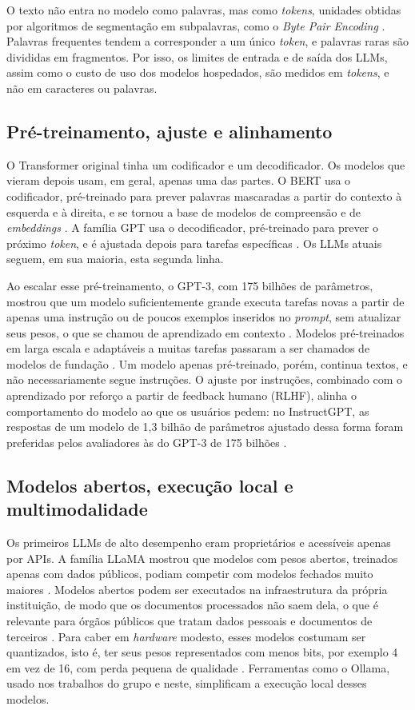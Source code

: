 O texto não entra no modelo como palavras, mas como \textit{tokens}, unidades obtidas por algoritmos de segmentação em subpalavras, como o \textit{Byte Pair Encoding} \cite{Sennrich2016}. Palavras frequentes tendem a corresponder a um único \textit{token}, e palavras raras são divididas em fragmentos. Por isso, os limites de entrada e de saída dos LLMs, assim como o custo de uso dos modelos hospedados, são medidos em \textit{tokens}, e não em caracteres ou palavras.

\subsection{Pré-treinamento, ajuste e alinhamento}

O Transformer original tinha um codificador e um decodificador. Os modelos que vieram depois usam, em geral, apenas uma das partes. O BERT usa o codificador, pré-treinado para prever palavras mascaradas a partir do contexto à esquerda e à direita, e se tornou a base de modelos de compreensão e de \textit{embeddings} \cite{Devlin2019}. A família GPT usa o decodificador, pré-treinado para prever o próximo \textit{token}, e é ajustada depois para tarefas específicas \cite{Radford2018}. Os LLMs atuais seguem, em sua maioria, esta segunda linha.

Ao escalar esse pré-treinamento, o GPT-3, com 175 bilhões de parâmetros, mostrou que um modelo suficientemente grande executa tarefas novas a partir de apenas uma instrução ou de poucos exemplos inseridos no \textit{prompt}, sem atualizar seus pesos, o que se chamou de aprendizado em contexto \cite{Brown2020}. Modelos pré-treinados em larga escala e adaptáveis a muitas tarefas passaram a ser chamados de modelos de fundação \cite{Bommasani2021}. Um modelo apenas pré-treinado, porém, continua textos, e não necessariamente segue instruções. O ajuste por instruções, combinado com o aprendizado por reforço a partir de feedback humano (RLHF), alinha o comportamento do modelo ao que os usuários pedem: no InstructGPT, as respostas de um modelo de 1,3 bilhão de parâmetros ajustado dessa forma foram preferidas pelos avaliadores às do GPT-3 de 175 bilhões \cite{Ouyang2022}.

\subsection{Modelos abertos, execução local e multimodalidade}

Os primeiros LLMs de alto desempenho eram proprietários e acessíveis apenas por APIs. A família LLaMA mostrou que modelos com pesos abertos, treinados apenas com dados públicos, podiam competir com modelos fechados muito maiores \cite{Touvron2023}. Modelos abertos podem ser executados na infraestrutura da própria instituição, de modo que os documentos processados não saem dela, o que é relevante para órgãos públicos que tratam dados pessoais e documentos de terceiros \cite{Brasil2018}. Para caber em \textit{hardware} modesto, esses modelos costumam ser quantizados, isto é, ter seus pesos representados com menos bits, por exemplo 4 em vez de 16, com perda pequena de qualidade \cite{Dettmers2023}. Ferramentas como o Ollama, usado nos trabalhos do grupo e neste, simplificam a execução local desses modelos.

